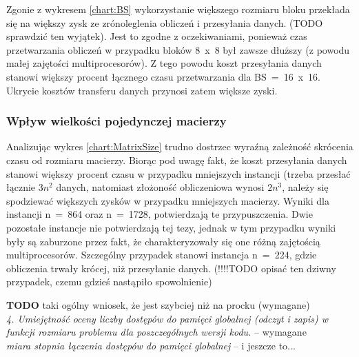 \documentclass[12pt,a4paper]{article}
\begin{document}
Zgonie z wykresem \ref{chart:BS} wykorzystanie większego rozmiaru bloku przekłada się na większy zysk ze zrónoleglenia obliczeń i przesyłania danych. (TODO sprawdzić ten wyjątek). Jest to zgodne z oczekiwaniami, ponieważ czas przetwarzania obliczeń w przypadku bloków 8~x~8 był zawsze dłuższy (z powodu małej zajętości multiprocesorów). Z tego powodu koszt przesyłania danych stanowi większy procent łącznego czasu przetwarzania dla BS~=~16~x~16. Ukrycie kosztów transferu danych przynosi zatem większe zyski.

\subsubsection*{Wpływ wielkości pojedynczej macierzy}

Analizując wykres \ref{chart:MatrixSize} trudno dostrzec wyraźną zależność skrócenia czasu od rozmiaru macierzy. Biorąc pod uwagę fakt, że koszt przesyłania danych stanowi większy procent czasu w przypadku mniejszych instancji (trzeba przesłać łącznie $3n^2$ danych, natomiast złożoność obliczeniowa wynosi $2n^3$, należy się spodziewać większych zysków w przypadku mniejszych macierzy. Wyniki dla instancji n~=~864 oraz n~=~1728, potwierdzają te przypuszczenia. Dwie pozostałe instancje nie potwierdzają tej tezy, jednak w tym przypadku wyniki były są zaburzone przez fakt, że charakteryzowały się one różną zajętością multiprocesorów. Szczególny przypadek stanowi instancja n~=~224, gdzie obliczenia trwały krócej, niż przesyłanie danych. (!!!!TODO opisać ten dziwny przypadek, czemu gdzieś nastąpiło spowolnienie)



\textbf{TODO} taki ogólny wniosek, że jest szybciej niż na procku (wymagane)\\
\textit{4. Umiejętność oceny liczby dostępów do pamięci globalnej (odczyt i zapis) w funkcji rozmiaru problemu dla
poszczególnych wersji kodu.} -- wymagane\\
\textit{miara stopnia łączenia dostępów do pamięci globalnej} -- i jeszcze to...
\end{document}
